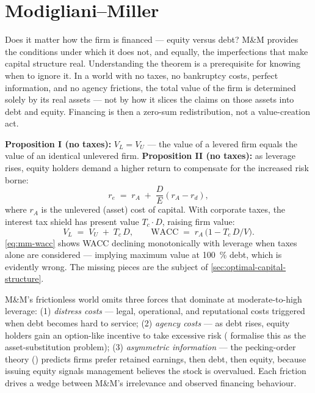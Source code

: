 \section{Modigliani--Miller}\label{sec:mm}

Does it matter how the firm is financed --- equity versus debt? M\&M provides the
conditions under which it does not, and equally, the imperfections that make capital
structure real. Understanding the theorem is a prerequisite for knowing when to ignore it.
In a world with no taxes, no bankruptcy costs, perfect information, and no agency frictions,
the total value of the firm is determined solely by its real assets --- not by how it slices
the claims on those assets into debt and equity. Financing is then a zero-sum
redistribution, not a value-creation act.

\textbf{Proposition I (no taxes):} \(V_L = V_U\) --- the value of a levered firm equals
the value of an identical unlevered firm. \textbf{Proposition II (no taxes):} as leverage
rises, equity holders demand a higher return to compensate for the increased risk borne:
\[
  r_e \;=\; r_A \;+\; \frac{D}{E}(r_A - r_d),
\]
where \(r_A\) is the unlevered (asset) cost of capital. With corporate taxes, the interest
tax shield has present value \(T_c\cdot D\), raising firm value:
\begin{equation}\label{eq:mm-wacc}
  V_L \;=\; V_U \;+\; T_c\,D,
  \qquad
  \mathrm{WACC} \;=\; r_A\,\bigl(1 - T_c\,D/V\bigr).
\end{equation}
\cref{eq:mm-wacc} shows WACC declining monotonically with leverage when taxes alone are
considered --- implying maximum value at \qty{100}{\percent} debt, which is evidently
wrong. The missing pieces are the subject of \cref{sec:optimal-capital-structure}.

M\&M's frictionless world omits three forces that dominate at moderate-to-high leverage:
(1) \emph{distress costs} --- legal, operational, and reputational costs triggered when
debt becomes hard to service; (2) \emph{agency costs} --- as debt rises, equity holders
gain an option-like incentive to take excessive risk (\textcite{jensen1976agency} formalise
this as the asset-substitution problem); (3) \emph{asymmetric information} --- the
pecking-order theory (\textcite{brealey2020}) predicts firms prefer retained earnings, then
debt, then equity, because issuing equity signals management believes the stock is
overvalued. Each friction drives a wedge between M\&M's irrelevance and observed financing
behaviour.

